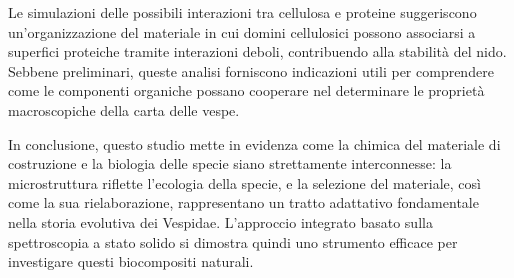 Le simulazioni delle possibili interazioni tra cellulosa e proteine suggeriscono un'organizzazione del materiale in cui domini cellulosici possono associarsi a superfici proteiche tramite interazioni deboli, contribuendo alla stabilità del nido. 
Sebbene preliminari, queste analisi forniscono indicazioni utili per comprendere come le componenti organiche possano cooperare nel determinare le proprietà macroscopiche della carta delle vespe.

In conclusione, questo studio mette in evidenza come la chimica del materiale di costruzione e la biologia delle specie siano strettamente interconnesse: la microstruttura riflette l’ecologia della specie, e la selezione del materiale, così come la sua rielaborazione, rappresentano un tratto adattativo fondamentale nella storia evolutiva dei Vespidae. 
L’approccio integrato basato sulla spettroscopia a stato solido si dimostra quindi uno strumento efficace per investigare questi biocompositi naturali.